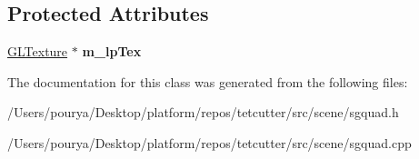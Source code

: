 \subsection*{Protected Attributes}
\begin{DoxyCompactItemize}
\item 
\hypertarget{classps_1_1scene_1_1SGQuad_a66b716e1fb9c9ce66a64c20db650860c}{}\hyperlink{classps_1_1opengl_1_1GLTexture}{G\+L\+Texture} $\ast$ {\bfseries m\+\_\+lp\+Tex}\label{classps_1_1scene_1_1SGQuad_a66b716e1fb9c9ce66a64c20db650860c}

\end{DoxyCompactItemize}


The documentation for this class was generated from the following files\+:\begin{DoxyCompactItemize}
\item 
/\+Users/pourya/\+Desktop/platform/repos/tetcutter/src/scene/sgquad.\+h\item 
/\+Users/pourya/\+Desktop/platform/repos/tetcutter/src/scene/sgquad.\+cpp\end{DoxyCompactItemize}
